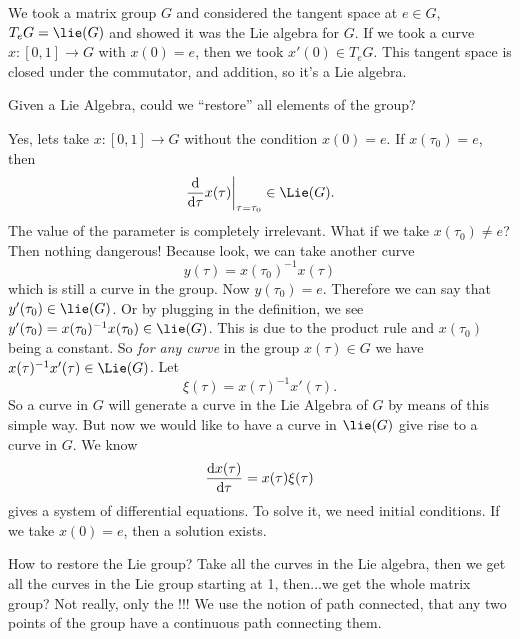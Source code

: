 We took a matrix group $G$ and considered the tangent space at
$e\in G$, $T_{e}G=\lie(G)$ and showed it was the Lie algebra for
$G$. If we took a curve $x\colon[0,1]\to G$ with $x(0)=e$, then
we took $x'(0)\in T_{e}G$. This tangent space is closed under the
commutator, and addition, so it's a Lie algebra.
\medbreak
\begin{quest}
Given a Lie Algebra, could we ``restore'' all elements of the group?
\end{quest}
\medbreak
Yes, lets take $x\colon[0,1]\to G$ without the condition
$x(0)=e$. If $x(\tau_{0})=e$, then 
\begin{equation}
\left.\frac{\D }{\D \tau}x(\tau)\right|_{\tau=\tau_{0}}\in\Lie(G).
\end{equation}
The value of the parameter is completely irrelevant. What if we
take $x(\tau_0)\not=e$? Then nothing dangerous! Because look, we
can take another curve
\begin{equation}
y(\tau)=x(\tau_{0})^{-1}x(\tau)
\end{equation}
which is still a curve in the group. Now
$y(\tau_{0})=e$. Therefore we can say that
$y'(\tau_{0})\in\lie(G)$. Or by plugging in the definition, we
see $y'(\tau_{0})=x(\tau_{0})^{-1}x(\tau_{0})\in\lie(G)$. This is
due to the product rule and $x(\tau_{0})$ being a constant. So
\emph{for any curve} in the group $x(\tau)\in G$ we have
$x(\tau)^{-1}x'(\tau)\in\Lie(G)$. Let
\begin{equation}
\xi(\tau)=x(\tau)^{-1}x'(\tau).
\end{equation}
So a curve in $G$ will generate a curve in the Lie Algebra of $G$
by means of this simple way. But now we would like to have a
curve in $\lie(G)$ give rise to a curve in $G$. We know
\begin{equation}
\frac{\mathrm{d} x(\tau)}{\mathrm{d} \tau}=x(\tau)\xi(\tau)
\end{equation}
gives a system of differential equations. To solve it, we need
initial conditions. If we take $x(0)=e$, then a solution exists.

How to restore the Lie group? Take all the curves in the Lie
algebra, then we get all the curves in the Lie group starting at
1, then...we get the whole matrix group? Not really, only the
!!! We use the notion of path connected,
that any two points of the group have a continuous path
connecting them. 

